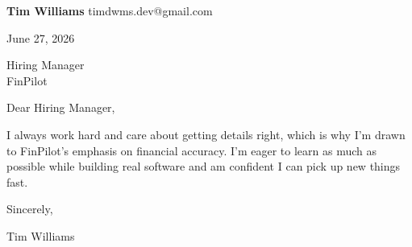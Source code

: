 \documentclass[12pt]{article}
\begin{document}
\textbf{Tim Williams} \hfill timdwms.dev@gmail.com

\vspace{1em}

June 27, 2026

\vspace{1em}

Hiring Manager \\
FinPilot

\vspace{1em}

Dear Hiring Manager,

I always work hard and care about getting details right, which is why I'm drawn to FinPilot's emphasis on financial accuracy. I'm eager to learn as much as possible while building real software and am confident I can pick up new things fast.

\vspace{1em}

Sincerely,

\vspace{2em}

Tim Williams
\end{document}
